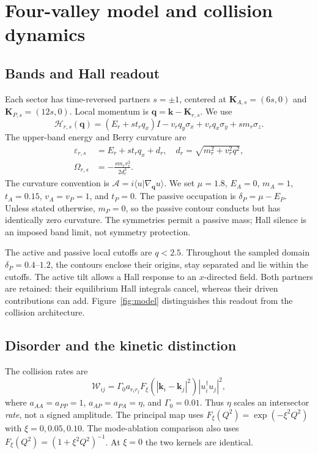 \section{Four-valley model and collision dynamics}
\subsection{Bands and Hall readout}
Each sector has time-reversed partners $s=\pm1$, centered at $\bm K_{A,s}=(6s,0)$ and $\bm K_{P,s}=(12s,0)$. Local momentum is $\bm q=\bm k-\bm K_{r,s}$. We use
\begin{equation}
\mathcal H_{r,s}(\bm q)=(E_r+st_rq_x)I
-v_rq_y\sigma_x+v_rq_x\sigma_y+sm_r\sigma_z.
\end{equation}
The upper-band energy and Berry curvature are
\begin{align}
\varepsilon_{r,s}&=E_r+st_rq_x+d_r,\quad
 d_r=\sqrt{m_r^2+v_r^2q^2},\\
\Omega_{r,s}&=-\frac{s m_rv_r^2}{2d_r^3}.
\end{align}
The curvature convention is $\bm{\mathcal A}=i\langle u|\nabla_{\bm q}u\rangle$. We set $\mu=1.8$, $E_A=0$, $m_A=1$, $t_A=0.15$, $v_A=v_P=1$, and $t_P=0$. The passive occupation is $\delta_P=\mu-E_P$. Unless stated otherwise, $m_P=0$, so the passive contour conducts but has identically zero curvature. The symmetries permit a passive mass; Hall silence is an imposed band limit, not symmetry protection.

The active and passive local cutoffs are $q<2.5$. Throughout the sampled domain $\delta_P=0.4$--$1.2$, the contours enclose their origins, stay separated and lie within the cutoffs. The active tilt allows a Hall response to an $x$-directed field. Both partners are retained: their equilibrium Hall integrals cancel, whereas their driven contributions can add. Figure~\ref{fig:model} distinguishes this readout from the collision architecture.



\subsection{Disorder and the kinetic distinction}
The collision rates are
\begin{equation}
\mathcal W_{ij}=\Gamma_0 a_{r_ir_j}
 F_\xi(|\bm k_i-\bm k_j|^2)|u_i^\dagger u_j|^2,
\label{eq:rates}
\end{equation}
where $a_{AA}=a_{PP}=1$, $a_{AP}=a_{PA}=\eta$, and $\Gamma_0=0.01$. Thus $\eta$ scales an intersector \emph{rate}, not a signed amplitude. The principal map uses $F_\xi(Q^2)=\exp(-\xi^2Q^2)$ with $\xi=0,0.05,0.10$. The mode-ablation comparison also uses $F_\xi(Q^2)=(1+\xi^2Q^2)^{-1}$. At $\xi=0$ the two kernels are identical.

